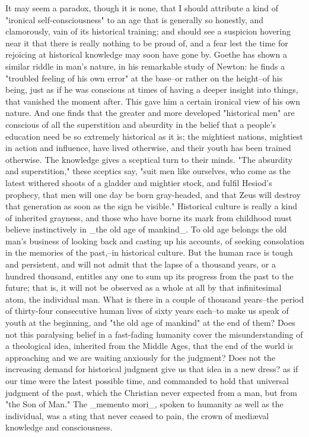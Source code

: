 It may seem a paradox, though it is none, that I should attribute a
kind of "ironical self-consciousness" to an age that is generally so
honestly, and clamorously, vain of its historical training; and
should see a suspicion hovering near it that there is really nothing
to be proud of, and a fear lest the time for rejoicing at historical
knowledge may soon have gone by. Goethe has shown a similar riddle in
man's nature, in his remarkable study of Newton: he finds a "troubled
feeling of his own error" at the base--or rather on the height--of
his being, just as if he was conscious at times of having a deeper
insight into things, that vanished the moment after. This gave him a
certain ironical view of his own nature. And one finds that the
greater and more developed "historical men" are conscious of all the
superstition and absurdity in the belief that a people's education
need be so extremely historical as it is; the mightiest nations,
mightiest in action and influence, have lived otherwise, and their
youth has been trained otherwise. The knowledge gives a sceptical
turn to their minds. "The absurdity and superstition," these sceptics
say, "suit men like ourselves, who come as the latest withered shoots
of a gladder and mightier stock, and fulfil Hesiod's prophecy, that
men will one day be born gray-headed, and that Zeus will destroy that
generation as soon as the sign be visible." Historical culture is
really a kind of inherited grayness, and those who have borne its
mark from childhood must believe instinctively in _the old age of
mankind_. To old age belongs the old man's business of looking back
and casting up his accounts, of seeking consolation in the memories
of the past,--in historical culture. But the human race is tough and
persistent, and will not admit that the lapse of a thousand years, or
a hundred thousand, entitles any one to sum up its progress from the
past to the future; that is, it will not be observed as a whole at
all by that infinitesimal atom, the individual man. What is there in
a couple of thousand years--the period of thirty-four consecutive
human lives of sixty years each--to make us speak of youth at the
beginning, and "the old age of mankind" at the end of them? Does not
this paralysing belief in a fast-fading humanity cover the
misunderstanding of a theological idea, inherited from the Middle
Ages, that the end of the world is approaching and we are waiting
anxiously for the judgment? Does not the increasing demand for
historical judgment give us that idea in a new dress? as if our time
were the latest possible time, and commanded to hold that universal
judgment of the past, which the Christian never expected from a man,
but from "the Son of Man." The _memento mori_, spoken to humanity as
well as the individual, was a sting that never ceased to pain, the
crown of mediæval knowledge and consciousness.

